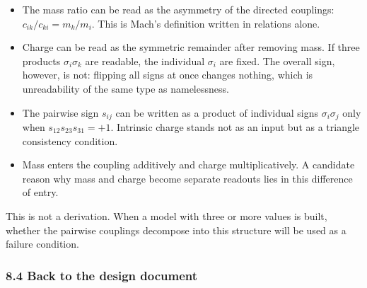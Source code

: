 \documentclass[
  a4paper,
]{article}
\providecommand{\tightlist}{%
  \setlength{\itemsep}{0pt}\setlength{\parskip}{0pt}}
\begin{document}
\begin{itemize}
\tightlist
\item
  The mass ratio can be read as the asymmetry of the directed couplings:
  \(c_{ik}/c_{ki}=m_k/m_i\). This is Mach's definition written in
  relations alone.
\item
  Charge can be read as the symmetric remainder after removing mass. If
  three products \(\sigma_i\sigma_k\) are readable, the individual
  \(\sigma_i\) are fixed. The overall sign, however, is not: flipping
  all signs at once changes nothing, which is unreadability of the same
  type as namelessness.
\item
  The pairwise sign \(s_{ij}\) can be written as a product of individual
  signs \(\sigma_i\sigma_j\) only when \(s_{12}s_{23}s_{31}=+1\).
  Intrinsic charge stands not as an input but as a triangle consistency
  condition.
\item
  Mass enters the coupling additively and charge multiplicatively. A
  candidate reason why mass and charge become separate readouts lies in
  this difference of entry.
\end{itemize}

This is not a derivation. When a model with three or more values is
built, whether the pairwise couplings decompose into this structure will
be used as a failure condition.

\subsubsection{8.4 Back to the design
document}\label{back-to-the-design-document}
\end{document}
